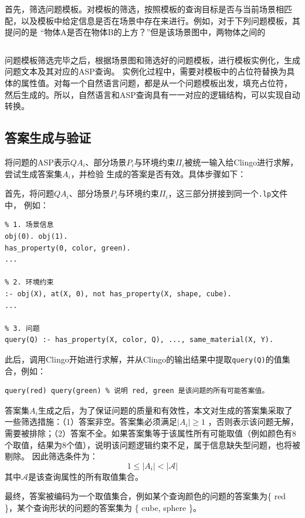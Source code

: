 首先，筛选问题模板。对模板的筛选，按照模板的查询目标是否与当前场景相匹配，以及模板中给定信息是否在场景中存在来进行。例如，对于下列问题模板，其提问的是
“物体A是否在物体B的上方？”但是该场景图中，两物体之间的
\begin{lstlisting}

\end{lstlisting}

问题模板筛选完毕之后，根据场景图和筛选好的问题模板，进行模板实例化，生成问题文本及其对应的ASP查询。
实例化过程中，需要对模板中的占位符替换为具体的属性值。对每一个自然语言问题，都是从一个问题模板出发，填充占位符，
然后生成的。所以，自然语言和ASP查询具有一一对应的逻辑结构，可以实现自动转换。


\subsection{答案生成与验证}
将问题的ASP表示$QA_i$、部分场景$P_i$与环境约束$\Pi_i$被统一输入给Clingo进行求解，尝试生成答案集$A_i$，并检验
生成的答案是否有效。具体步骤如下：

首先，将问题$QA_i$、部分场景$P_i$与环境约束$\Pi_i$，这三部分拼接到同一个\texttt{.lp}文件中，
例如：
\begin{lstlisting}
% 1. 场景信息
obj(0). obj(1).
has_property(0, color, green).
...

% 2. 环境约束
:- obj(X), at(X, 0), not has_property(X, shape, cube).
...

% 3. 问题
query(Q) :- has_property(X, color, Q), ..., same_material(X, Y).
\end{lstlisting}

此后，调用Clingo开始进行求解，并从Clingo的输出结果中提取\texttt{query(Q)}的值集合，例如：
\begin{lstlisting}
query(red) query(green) % 说明 red, green 是该问题的所有可能答案值。
\end{lstlisting}

答案集$A_i$生成之后，为了保证问题的质量和有效性，本文对生成的答案集采取了一些筛选措施：（1）答案非空。答案集必须满足$|A_i| \geq 1$
，否则表示该问题无解，需要被排除；（2）答案不全。如果答案集等于该属性所有可能取值（例如颜色有8个取值，结果为8个值），说明该问题逻辑约束不足，属于信息缺失型问题，也将被剔除。
因此筛选条件为：
$$1 \leq |A_i| < |\mathcal{A} |$$
其中$\mathcal{A} $是该查询属性的所有取值集合。

最终，答案被编码为一个取值集合，例如某个查询颜色的问题的答案集为\{ red \}，某个查询形状的问题的答案集为
\{ cube, sphere \}。
